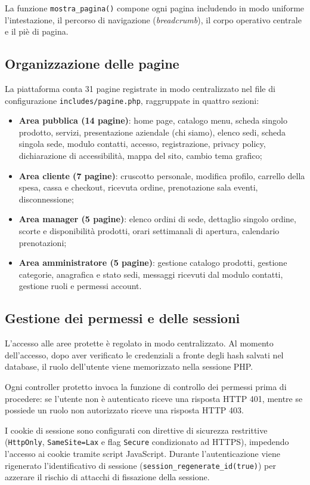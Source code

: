 \documentclass[a4paper,11pt]{article}
\begin{document}
La funzione \texttt{mostra\_pagina()} compone ogni pagina includendo in modo uniforme l'intestazione, il percorso di navigazione (\textit{breadcrumb}), il corpo operativo centrale e il piè di pagina.

\subsection{Organizzazione delle pagine}
La piattaforma conta 31 pagine registrate in modo centralizzato nel file di configurazione \texttt{includes/pagine.php}, raggruppate in quattro sezioni:
\begin{itemize}
    \item \textbf{Area pubblica (14 pagine)}: home page, catalogo menu, scheda singolo prodotto, servizi, presentazione aziendale (chi siamo), elenco sedi, scheda singola sede, modulo contatti, accesso, registrazione, privacy policy, dichiarazione di accessibilità, mappa del sito, cambio tema grafico;
    \item \textbf{Area cliente (7 pagine)}: cruscotto personale, modifica profilo, carrello della spesa, cassa e checkout, ricevuta ordine, prenotazione sala eventi, disconnessione;
    \item \textbf{Area manager (5 pagine)}: elenco ordini di sede, dettaglio singolo ordine, scorte e disponibilità prodotti, orari settimanali di apertura, calendario prenotazioni;
    \item \textbf{Area amministratore (5 pagine)}: gestione catalogo prodotti, gestione categorie, anagrafica e stato sedi, messaggi ricevuti dal modulo contatti, gestione ruoli e permessi account.
\end{itemize}

\subsection{Gestione dei permessi e delle sessioni}
L'accesso alle aree protette è regolato in modo centralizzato. Al momento dell'accesso, dopo aver verificato le credenziali a fronte degli hash salvati nel database, il ruolo dell'utente viene memorizzato nella sessione PHP.

Ogni controller protetto invoca la funzione di controllo dei permessi prima di procedere: se l'utente non è autenticato riceve una risposta HTTP 401, mentre se possiede un ruolo non autorizzato riceve una risposta HTTP 403.

I cookie di sessione sono configurati con direttive di sicurezza restrittive (\texttt{HttpOnly}, \texttt{SameSite=Lax} e flag \texttt{Secure} condizionato ad HTTPS), impedendo l'accesso ai cookie tramite script JavaScript. Durante l'autenticazione viene rigenerato l'identificativo di sessione (\texttt{session\_regenerate\_id(true)}) per azzerare il rischio di attacchi di fissazione della sessione.
\end{document}
